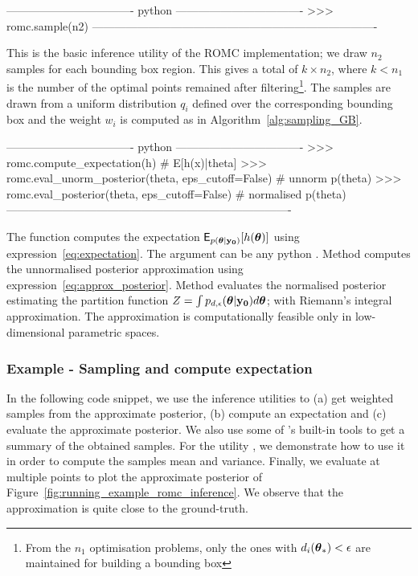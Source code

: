 \begin{Code}
---------------------------------- python ----------------------------------
>>> romc.sample(n2)
----------------------------------------------------------------------------
\end{Code}

\noindent
This is the basic inference utility of the ROMC implementation; we
draw \(n_2\) samples for each bounding box region. This gives a total of
\(k \times n_2\), where \(k < n_1\) is the number of the optimal points
remained after filtering\footnote{From the \(n_1\) optimisation
  problems, only the ones with \(d_i(\boldsymbol{\theta}_*) < \epsilon\) are
  maintained for building a bounding box}. The samples are drawn from
a uniform distribution \(q_i\) defined over the corresponding bounding
box and the weight \(w_i\) is computed as in
Algorithm~\ref{alg:sampling_GB}.

\begin{Code}
---------------------------------- python ----------------------------------
>>> romc.compute_expectation(h) # E[h(x)|theta]
>>> romc.eval_unorm_posterior(theta, eps_cutoff=False) # unnorm p(theta)
>>> romc.eval_posterior(theta, eps_cutoff=False) # normalised p(theta)
----------------------------------------------------------------------------
\end{Code}

\noindent
The function  computes the expectation
\(\mathsf{E}_{p(\boldsymbol{\theta}|\mathbf{y_0})}[h(\boldsymbol{\theta})]\) using
expression~\eqref{eq:expectation}. The argument  can be any
python . Method  computes
the unnormalised posterior approximation using
expression~\eqref{eq:approx_posterior}. Method 
evaluates the normalised posterior estimating the partition function
\(Z = \int p_{d,\epsilon}(\boldsymbol{\theta}|\mathbf{y_0})d\boldsymbol{\theta}\); with Riemann's
integral approximation. The approximation is computationally feasible
only in low-dimensional parametric spaces.

\subsubsection*{Example - Sampling and compute expectation}

In the following code snippet, we use the inference utilities to (a)
get weighted samples from the approximate posterior, (b) compute an
expectation and (c) evaluate the approximate posterior. We also use
some of 's built-in tools to get a summary of the obtained
samples. For the utility , we demonstrate
how to use it in order to compute the samples mean and
variance. Finally, we evaluate  at multiple
points to plot the approximate posterior of
Figure~\ref{fig:running_example_romc_inference}. We observe that the
approximation is quite close to the ground-truth.

